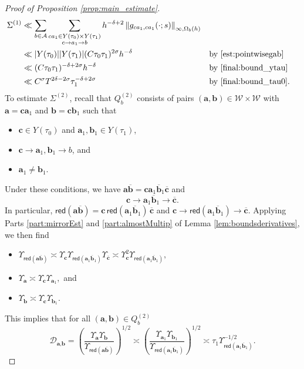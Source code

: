 \documentclass[12pt,letterpaper]{amsart}
\theoremstyle{plain}
\theoremstyle{definition}
\theoremstyle{remark}
\newcommand{\Aa}{\textbf{a}}
\newcommand{\Bb}{\textbf{b}}
\newcommand{\Cc}{\textbf{c}}
\begin{document}
\begin{proof}[Proof of Proposition \ref{prop:main_estimate}]
\begin{align}
\Sigma^{(1)} &\ll \sum_{b\in \mathcal{A}}  
\sum_{\substack{ \Cc \Aa_1 \in Y(\tau_0)\times Y(\tau_1)  \\ 
\Cc \to \Aa_1 \to b
}} h^{-\delta + 2} \left\Vert g_{\Cc \Aa_1, \Cc \Aa_1}(\cdot;s) \right\Vert_{\infty,\Omega_b(h)}   \\
&\ll \vert Y(\tau_0)\vert \vert Y(\tau_1)\vert (C \tau_0\tau_1)^{2\sigma} h^{-\delta} &&\text{by \eqref{est:pointwisegab}}\\
&\ll ( C\tau_0 \tau_1 )^{-\delta + 2\sigma} h^{-\delta}&&\text{by \eqref{final:bound_ytau}} \\
&\ll C^\sigma T^{2\delta-2 \sigma} \tau_1 ^{-\delta + 2\sigma} &&\text{by \eqref{final:bound_tau0}} \label{final1}.
\end{align}
To estimate $\Sigma^{(2)}$, recall that $Q_b^{(2)}$ consists of pairs $(\Aa,\Bb)\in \mathcal{W}\times \mathcal{W}$ with $\Aa=\Cc\Aa_1$ and $\Bb=\Cc\Bb_1$ such that
\begin{itemize}
\item $\Cc\in Y(\tau_0)$ and $\Aa_1, \Bb_1 \in Y(\tau_1)$,
\item $\Cc \to \Aa_1, \Bb_1 \to b$, and
\item $\Aa_1\neq \Bb_1$.
\end{itemize}
Under these conditions, we have $\Aa \overline{\Bb} = \Cc\Aa_1 \overline{\Bb}_1 \overline{\Cc}$ and
$$
\Cc \to \Aa_1 \overline{\Bb}_1 \to \overline{\Cc}.
$$
In particular, $\mathsf{red}(\Aa\overline{\Bb}) = \Cc \, \mathsf{red}( \Aa_1 \overline{\Bb}_1 )\, \overline{\Cc}$ and $\Cc \to \mathsf{red}( \Aa_1 \overline{\Bb}_1 )\to \overline{\Cc}$. Applying Parts \eqref{part:mirrorEst} and \eqref{part:almostMultip} of Lemma \ref{lem:boundsderivatives}, we then find
\begin{itemize}
\item $\Upsilon_{\mathsf{red}(\Aa\overline{\Bb})}  \asymp \Upsilon_{\Cc} \Upsilon_{\mathsf{red}(\Aa_1 \overline{\Bb}_1)} \Upsilon_{\overline{\Cc}} \asymp \Upsilon_\Cc^2 \Upsilon_{\mathsf{red}(\Aa_1 \overline{\Bb}_1)} , $
\item $\Upsilon_{\Aa} \asymp \Upsilon_\Cc  \Upsilon_{\Aa_1},$ and
\item $\Upsilon_{\Bb} \asymp \Upsilon_\Cc  \Upsilon_{\Bb_1}.$
\end{itemize}
This implies that for all $(\Aa,\Bb)\in Q_b^{(2)}$
\begin{equation}\label{final:bound_Dab}
\mathcal{D}_{\Aa,\Bb} = \left(  \frac{\Upsilon_{\Aa} \Upsilon_{\Bb} }{\Upsilon_{\mathsf{red}(\Aa\overline{\Bb})}}\right)^{1/2} \asymp \left(  \frac{  \Upsilon_{\Aa_1} \Upsilon_{\Bb_1} }{  \Upsilon_{\mathsf{red}(\Aa_1 \overline{\Bb}_1)}  }\right)^{1/2} \asymp \tau_1 \Upsilon_{\mathsf{red}(\Aa_1 \overline{\Bb}_1)}^{-1/2}.

\end{equation}
\end{proof}
\end{document}
